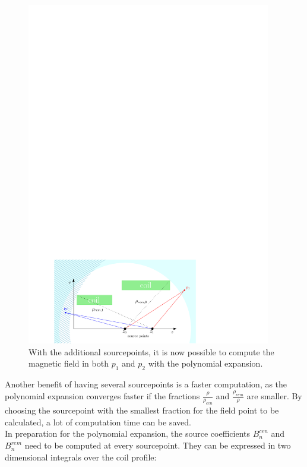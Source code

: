 \begin{figure}[htbp]
\begin{minipage}{0.49\textwidth}
		\includegraphics[width=0.95\textwidth]{images/KAFCAFigures/two_coils_remote_two_sp.pdf}
	      \end{minipage}
	      \caption{With the additional sourcepoints, it is now possible to compute the magnetic field in both $p_1$ and $p_2$ with the polynomial expansion.}
	      \label{fig:two coils two sourcepoints}
	\end{figure}
	Another benefit of having several sourcepoints is a faster computation, as the polynomial expansion converges faster if the fractions $\frac{\rho}{\rho_{cen}}$ and $\frac{\rho_{rem}}{\rho}$ are smaller. By choosing the sourcepoint with the smallest fraction for the field point to be calculated, a lot of computation time can be saved.
	\\
	In preparation for the polynomial expansion, the source coefficients $B_{n}^{cen}$ and $B_{n}^{rem}$ need to be computed at every sourcepoint. They can be expressed in two dimensional integrals over the coil profile:
